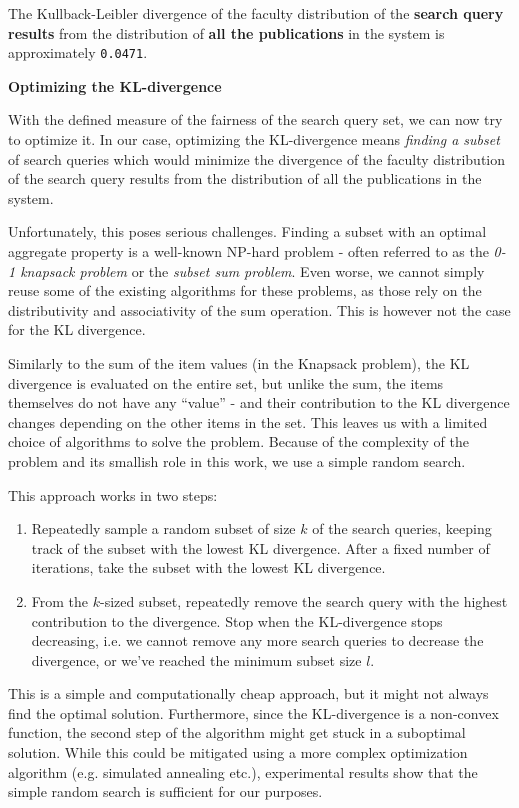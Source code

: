 The Kullback-Leibler divergence of the faculty distribution of the \textbf{search query results} from the distribution of \textbf{all the publications} in the system is approximately \texttt{0.0471}.

\textbf{Optimizing the KL-divergence}

With the defined measure of the fairness of the search query set, we can now try to optimize it.
In our case, optimizing the KL-divergence means \textit{finding a subset} of search queries which would minimize the divergence of the faculty distribution of the search query results from the distribution of all the publications in the system.

Unfortunately, this poses serious challenges. 
Finding a subset with an optimal aggregate property is a well-known NP-hard problem - often referred to as the \textit{0-1 knapsack problem} or the \textit{subset sum problem}.
Even worse, we cannot simply reuse some of the existing algorithms for these problems, as those rely on the distributivity and associativity of the sum operation. 
This is however not the case for the KL divergence.

Similarly to the sum of the item values (in the Knapsack problem), the KL divergence is evaluated on the entire set, but unlike the sum, the items themselves do not have any “value” - and their contribution to the KL divergence changes depending on the other items in the set. 
This leaves us with a limited choice of algorithms to solve the problem. 
Because of the complexity of the problem and its smallish role in this work, we use a simple random search. 

This approach works in two steps:

\begin{enumerate}
    \item Repeatedly sample a random subset of size $k$ of the search queries, keeping track of the subset with the lowest KL divergence.
After a fixed number of iterations, take the subset with the lowest KL divergence.
    \item From the $k$-sized subset, repeatedly remove the search query with the highest contribution to the divergence.
Stop when the KL-divergence stops decreasing, i.e. we cannot remove any more search queries to decrease the divergence, or we've reached the minimum subset size $l$.
\end{enumerate}

This is a simple and computationally cheap approach, but it might not always find the optimal solution.
Furthermore, since the KL-divergence is a non-convex function, the second step of the algorithm might get stuck in a suboptimal solution.
While this could be mitigated using a more complex optimization algorithm (e.g. simulated annealing etc.), experimental results show that the simple random search is sufficient for our purposes.

